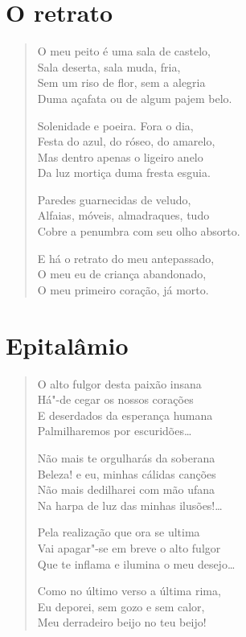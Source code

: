 \pagebreak
\section{O retrato}

\begin{verse}
O meu peito é uma sala de castelo,\\
Sala deserta, sala muda, fria,\\
Sem um riso de flor, sem a alegria\\
Duma açafata ou de algum pajem belo.

Solenidade e poeira. Fora o dia,\\
Festa do azul, do róseo, do amarelo,\\
Mas dentro apenas o ligeiro anelo\\
Da luz mortiça duma fresta esguia.

Paredes guarnecidas de veludo,\\
Alfaias, móveis, almadraques, tudo\\
Cobre a penumbra com seu olho absorto.

E há o retrato do meu antepassado,\\
O meu eu de criança abandonado,\\
O meu primeiro coração, já morto.
\end{verse}

\pagebreak
\section{Epitalâmio}

\begin{verse}
O alto fulgor desta paixão insana\\
Há"-de cegar os nossos corações\\
E deserdados da esperança humana\\
Palmilharemos por escuridões\ldots{}

Não mais te orgulharás da soberana\\
Beleza! e eu, minhas cálidas canções\\
Não mais dedilharei com mão ufana\\
Na harpa de luz das minhas ilusões!\ldots{}

Pela realização que ora se ultima\\
Vai apagar"-se em breve o alto fulgor\\
Que te inflama e ilumina o meu desejo\ldots{}

Como no último verso a última rima,\\
Eu deporei, sem gozo e sem calor,\\
Meu derradeiro beijo no teu beijo!
\end{verse}


